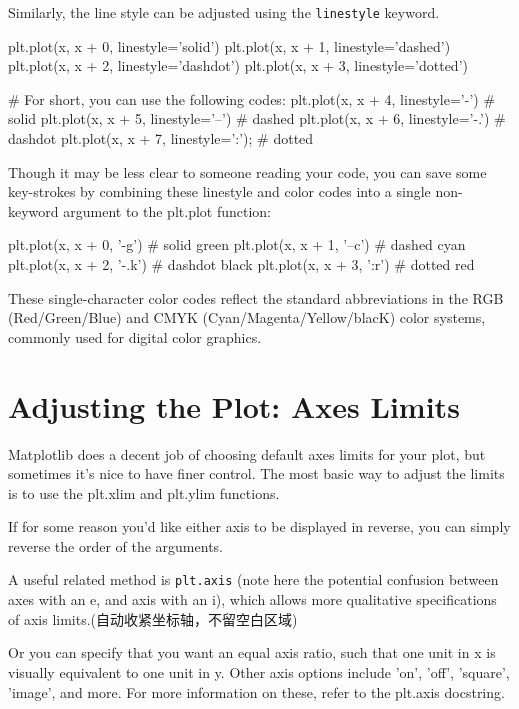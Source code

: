 Similarly, the line style can be adjusted using the \verb|linestyle| keyword.

\begin{pyc}
    plt.plot(x, x + 0, linestyle='solid')
    plt.plot(x, x + 1, linestyle='dashed')
    plt.plot(x, x + 2, linestyle='dashdot')
    plt.plot(x, x + 3, linestyle='dotted')

    # For short, you can use the following codes:
    plt.plot(x, x + 4, linestyle='-')  # solid
    plt.plot(x, x + 5, linestyle='--') # dashed
    plt.plot(x, x + 6, linestyle='-.') # dashdot
    plt.plot(x, x + 7, linestyle=':'); # dotted
\end{pyc}

Though it may be less clear to someone reading your code, you can save some key-strokes by combining these linestyle and color codes into a single non-keyword
argument to the plt.plot function:

\begin{pyc}
    plt.plot(x, x + 0, '-g')  # solid green
    plt.plot(x, x + 1, '--c') # dashed cyan
    plt.plot(x, x + 2, '-.k') # dashdot black
    plt.plot(x, x + 3, ':r')  # dotted red
\end{pyc}

These single-character color codes reflect the standard abbreviations in the RGB
(Red/Green/Blue) and CMYK (Cyan/Magenta/Yellow/blacK) color systems, commonly used for digital color graphics.

\section{Adjusting the Plot: Axes Limits}
Matplotlib does a decent job of choosing default axes limits for your plot, but sometimes it's nice to have finer control. The most basic way to adjust the limits is to use
the plt.xlim and plt.ylim functions.

If for some reason you'd like either axis to be displayed in reverse, you can simply
reverse the order of the arguments.

A useful related method is \verb|plt.axis| (note here the potential confusion between axes
with an e, and axis with an i), which allows more qualitative specifications of axis limits.(自动收紧坐标轴，不留空白区域)

Or you can specify that you want an equal axis ratio, such that one unit in x is visually
equivalent to one unit in y. Other axis options include 'on', 'off', 'square', 'image', and more. For more
information on these, refer to the plt.axis docstring.


